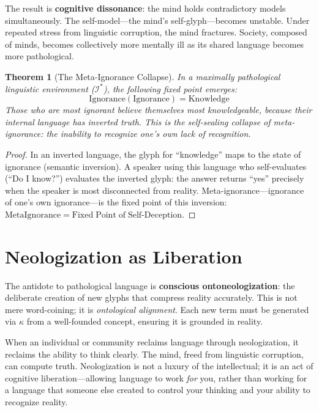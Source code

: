 \documentclass[12pt, letterpaper]{book}
\def\equiv{=}%
\newtheorem{theorem}{Theorem}[chapter]
\begin{document}
The result is \textbf{cognitive dissonance}: the mind holds contradictory models simultaneously. The self-model---the mind's self-glyph---becomes unstable. Under repeated stress from linguistic corruption, the mind fractures. Society, composed of minds, becomes collectively more mentally ill as its shared language becomes more pathological.

\begin{theorem}[The Meta-Ignorance Collapse]\label{thm:meta-ignorance}
In a maximally pathological linguistic environment ($\mathcal{I}^*$), the following fixed point emerges:
\[
\mathrm{Ignorance}(\mathrm{Ignorance}) \equiv \mathrm{Knowledge}
\]
Those who are most ignorant believe themselves most knowledgeable, because their internal language has inverted truth. This is the self-sealing collapse of meta-ignorance: the inability to recognize one's own lack of recognition.
\end{theorem}

\begin{proof}
In an inverted language, the glyph for ``knowledge'' maps to the state of ignorance (semantic inversion). A speaker using this language who self-evaluates (``Do I know?'') evaluates the inverted glyph: the answer returns ``yes'' precisely when the speaker is most disconnected from reality. Meta-ignorance---ignorance of one's own ignorance---is the fixed point of this inversion: $\mathrm{MetaIgnorance} \equiv \mathrm{Fixed\; Point\; of\; Self\text{-}Deception}$.
\end{proof}

\section{Neologization as Liberation}

The antidote to pathological language is \textbf{conscious ontoneologization}: the deliberate creation of new glyphs that compress reality accurately. This is not mere word-coining; it is \textit{ontological alignment}. Each new term must be generated via $\kappa$ from a well-founded concept, ensuring it is grounded in reality.

When an individual or community reclaims language through neologization, it reclaims the ability to think clearly. The mind, freed from linguistic corruption, can compute truth. Neologization is not a luxury of the intellectual; it is an act of cognitive liberation---allowing language to work \textit{for} you, rather than working for a language that someone else created to control your thinking and your ability to recognize reality.
\end{document}
